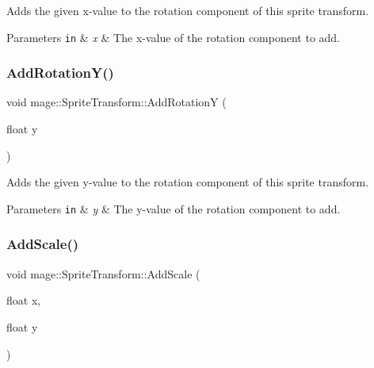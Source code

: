 Adds the given x-\/value to the rotation component of this sprite transform.


\begin{DoxyParams}[1]{Parameters}
\mbox{\tt in}  & {\em x} & The x-\/value of the rotation component to add. \\
\hline
\end{DoxyParams}
\hypertarget{structmage_1_1_sprite_transform_a2b5b1142bb208f7a401d62fee54cab57}{}\label{structmage_1_1_sprite_transform_a2b5b1142bb208f7a401d62fee54cab57} 
\subsubsection{\texorpdfstring{Add\+Rotation\+Y()}{AddRotationY()}}
{\footnotesize\ttfamily void mage\+::\+Sprite\+Transform\+::\+Add\+RotationY (\begin{DoxyParamCaption}\item[{float}]{y }\end{DoxyParamCaption})}

Adds the given y-\/value to the rotation component of this sprite transform.


\begin{DoxyParams}[1]{Parameters}
\mbox{\tt in}  & {\em y} & The y-\/value of the rotation component to add. \\
\hline
\end{DoxyParams}
\hypertarget{structmage_1_1_sprite_transform_a4e260b9085f2609523979a7a0446c748}{}\label{structmage_1_1_sprite_transform_a4e260b9085f2609523979a7a0446c748} 
\subsubsection{\texorpdfstring{Add\+Scale()}{AddScale()}\hspace{0.1cm}{\footnotesize\ttfamily [1/2]}}
{\footnotesize\ttfamily void mage\+::\+Sprite\+Transform\+::\+Add\+Scale (\begin{DoxyParamCaption}\item[{float}]{x,  }\item[{float}]{y }\end{DoxyParamCaption})}

